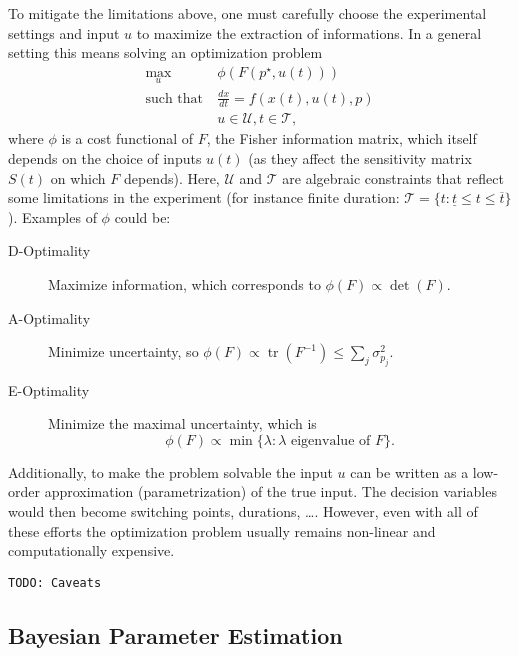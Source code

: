 \documentclass[a4paper]{article}
\newcommand{\todo}[1]{\texttt{TODO: #1}}
\DeclareMathOperator{\st}{such~that}
\DeclareMathOperator{\tr}{tr}
\theoremstyle{plain}
\theoremstyle{definition}
\theoremstyle{remark}
\begin{document}
To mitigate the limitations above, one must carefully choose the experimental
settings and input $u$ to maximize the extraction of informations. In a
general setting this means solving an optimization problem
\begin{align*}
  \max_u ~ & \phi(F(p^\star, u(t))) \\
  \st ~ & \frac{dx}{dt} = f(x(t), u(t), p) \\
        & u \in \mathcal{U}, t \in \mathcal{T},
\end{align*}
where $\phi$ is a cost functional of $F$, the Fisher information matrix, which
itself depends on the choice of inputs $u(t)$ (as they affect the sensitivity
matrix $S(t)$ on which $F$ depends). Here, $\mathcal{U}$ and $\mathcal{T}$
are algebraic constraints that reflect some limitations in the experiment (for
instance finite duration: $\mathcal{T} = \{t : \underline{t} \leq t \leq
\overline{t}\}$). Examples of $\phi$ could be:
\begin{description}
  \item[D-Optimality] Maximize information, which corresponds to $\phi(F)
    \propto \det(F)$.

  \item[A-Optimality] Minimize uncertainty, so
      $\phi(F) \propto \tr(F^{-1}) \leq \sum_j \sigma^2_{p_j}$.

  \item[E-Optimality] Minimize the maximal uncertainty, which is
    \[
      \phi(F) \propto \min \{\lambda : \lambda \text{ eigenvalue of } F\}.
    \]
\end{description}
Additionally, to make the problem solvable the input $u$ can be written as a
low-order approximation (parametrization) of the true input. The decision
variables would then become switching points, durations, \ldots. However, even
with all of these efforts the optimization problem usually remains non-linear
and computationally expensive.

\todo{Caveats}

\subsection{Bayesian Parameter Estimation}
\end{document}
